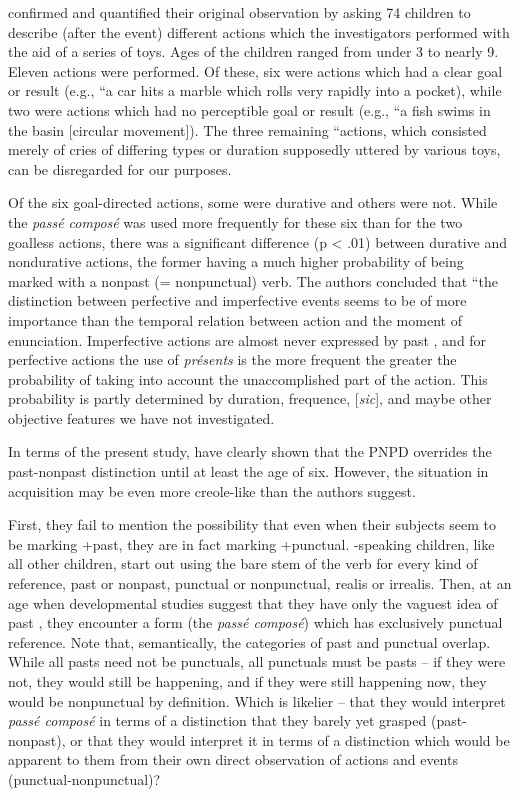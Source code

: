 \citeauthor{BrockartEtAl1973} confirmed and quantified their original observation by asking 74 children to describe (after the event) different  actions which the investigators performed with the aid of a series of toys. Ages of the children ranged from under 3 to nearly 9. Eleven actions were performed. Of these, six were actions which had a clear goal or result (e.g., ``a car hits a marble which rolls very rapidly into a pocket), while two were actions which had no perceptible goal or result (e.g., ``a fish swims in the basin [circular movement]). The three remaining ``actions, which consisted merely of cries of differing types or duration supposedly uttered by various toys, can be disregarded for our purposes.

Of the six goal-directed actions, some were durative and others were not. While the  \textit{pass\'e compos\'e} was used more frequently for these six than for the two goalless actions, there was a significant difference (p {\textless} .01) between durative and nondurative actions, the former having a much higher probability of being marked with a nonpast (= nonpunctual) verb. The authors concluded that ``the distinction between perfective and imperfective events seems to be of more importance than the temporal relation between action and the moment of enunciation. Imperfective actions are almost never ex\-pressed by past , and for perfective actions the use of \textit{pr\'esents} is the more frequent the greater the probability of taking into account the unaccomplished part of the action. This probability is partly determined by duration, frequence, [\textit{sic}], and maybe other objective features we have not investigated.


In terms of the present study, \citeauthor{BrockartEtAl1973} have clearly shown that the PNPD overrides the past-nonpast distinction until at least the age of six. However, the situation in  acquisition may be even more creole-like than the authors suggest.

First, they fail to mention the possibility that even when their subjects seem to be marking +past, they are in fact marking +punctual. -speaking children, like all other children, start out using the bare stem of the verb for every kind of reference, past or nonpast, punctual or nonpunctual, realis or irrealis. Then, at an age when devel\-opmental studies suggest that they have only the vaguest idea of past , they encounter a form (the \textit{pass\'e compos\'e}) which has exclusively punctual reference. Note that, semantically, the categories of past and punctual overlap. While all pasts need not be punctuals, all punctuals must be pasts -- if they were not, they would still be happening, and if they were still happening now, they would be nonpunctual by defini\-tion. Which is likelier -- that they would interpret \textit{pass\'e compos\'e} in terms of a distinction that they barely yet grasped (past-nonpast), or that they would interpret it in terms of a distinction which would be apparent to them from their own direct observation of actions and events (punctual-nonpunctual)?

